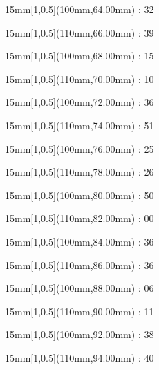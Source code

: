 \documentclass[a5paper]{memoir}
\begin{document}
\begin{textblock*}{15mm}[1,0.5](100mm,64.00mm) : 32\gridstrut\end{textblock*}
\begin{textblock*}{15mm}[1,0.5](110mm,66.00mm) : 39\gridstrut\end{textblock*}
\begin{textblock*}{15mm}[1,0.5](100mm,68.00mm) : 15\gridstrut\end{textblock*}
\begin{textblock*}{15mm}[1,0.5](110mm,70.00mm) : 10\gridstrut\end{textblock*}
\begin{textblock*}{15mm}[1,0.5](100mm,72.00mm) : 36\gridstrut\end{textblock*}
\begin{textblock*}{15mm}[1,0.5](110mm,74.00mm) : 51\gridstrut\end{textblock*}
\begin{textblock*}{15mm}[1,0.5](100mm,76.00mm) : 25\gridstrut\end{textblock*}
\begin{textblock*}{15mm}[1,0.5](110mm,78.00mm) : 26\gridstrut\end{textblock*}
\begin{textblock*}{15mm}[1,0.5](100mm,80.00mm) : 50\gridstrut\end{textblock*}
\begin{textblock*}{15mm}[1,0.5](110mm,82.00mm) : 00\gridstrut\end{textblock*}
\begin{textblock*}{15mm}[1,0.5](100mm,84.00mm) : 36\gridstrut\end{textblock*}
\begin{textblock*}{15mm}[1,0.5](110mm,86.00mm) : 36\gridstrut\end{textblock*}
\begin{textblock*}{15mm}[1,0.5](100mm,88.00mm) : 06\gridstrut\end{textblock*}
\begin{textblock*}{15mm}[1,0.5](110mm,90.00mm) : 11\gridstrut\end{textblock*}
\begin{textblock*}{15mm}[1,0.5](100mm,92.00mm) : 38\gridstrut\end{textblock*}
\begin{textblock*}{15mm}[1,0.5](110mm,94.00mm) : 40\gridstrut\end{textblock*}
\end{document}
